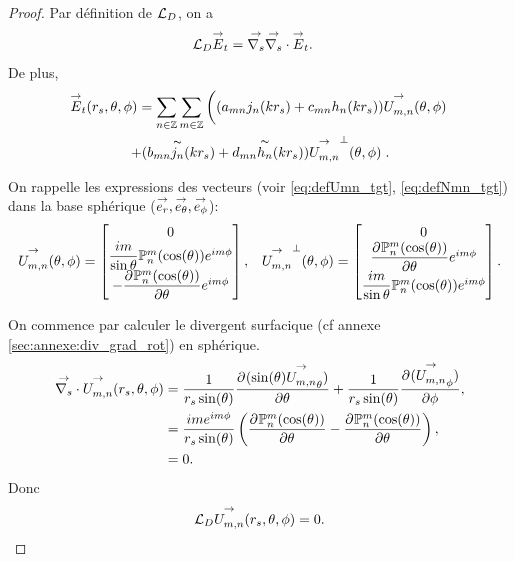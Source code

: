     \begin{proof}
      Par définition de \({\mathcal{L}_D}\), on a
      \begin{align*}
        {\mathcal{L}_D} {\overset{\rightarrow}{E}}_t & = {\overset{\rightarrow}{\nabla_s}}{} {\overset{\rightarrow}{\nabla_s}} \cdot{} {\overset{\rightarrow}{E}}_t.
      \end{align*}
      De plus, 
      \begin{multline*}
        {\overset{\rightarrow}{E}}_t(r_s,\theta,\phi) = \sum_{n\in\mathbb Z}\sum_{m\in\mathbb Z} \left( (a_{mn} j_n(kr_s) + c_{mn}h_n(kr_s)) {\overset{\rightarrow}{U_{m,n}^{{}}}}(\theta,\phi) 
        \right.
        \\
        \left.
        + (b_{mn} \overset{\thicksim}{j_n}(kr_s)+d_{mn} \overset{\thicksim}{h_n}(kr_s)) {\overset{\rightarrow}{U_{m,n}^{{}}}}^\perp(\theta,\phi)\right.
        .
      \end{multline*}

      On rappelle  les expressions des vecteurs (voir \eqref{eq:defUmn_tgt}, \eqref{eq:defNmn_tgt}) dans la base sphérique (\({\overset{\rightarrow}{e_r}},{\overset{\rightarrow}{e_\theta}},{\overset{\rightarrow}{e_\phi}}\)): 
      \begin{align*}
        {\overset{\rightarrow}{U_{m,n}^{{}}}}(\theta,\phi) =
        \begin{bmatrix}
            0
            \\
            \dfrac{im}{\sin\theta}\mathbb{P}^m_n(\cos(\theta))e^{im\phi}
            \\
            - \dfrac{\partial^{{}} \mathbb{P}^m_n(\cos(\theta))}{{\partial \theta}^{{}}}e^{im\phi}
        \end{bmatrix},
        &&
        {\overset{\rightarrow}{U_{m,n}^{{}}}}^\perp(\theta,\phi) =
        \begin{bmatrix}
          0
          \\
          \dfrac{\partial^{{}} \mathbb{P}^m_n(\cos(\theta))}{{\partial \theta}^{{}}}e^{im\phi}
          \\
          \dfrac{im}{\sin\theta}\mathbb{P}^m_n(\cos(\theta))e^{im\phi}
        \end{bmatrix}.
      \end{align*}

      On commence par calculer le divergent surfacique (cf annexe \ref{sec:annexe:div_grad_rot}) en sphérique.
      \begin{align*}
        {\overset{\rightarrow}{\nabla_s}} \cdot{}{\overset{\rightarrow}{U_{m,n}^{{}}}}(r_s,\theta,\phi) &= \dfrac{1}{r_s\sin(\theta)} \dfrac{\partial^{{}} (\sin(\theta){\overset{\rightarrow}{U_{m,n}^{{}}}}_\theta)}{{\partial \theta}^{{}}} + \dfrac{1}{r_s\sin(\theta)}\dfrac{\partial^{{}} ({\overset{\rightarrow}{U_{m,n}^{{}}}}_\phi)}{{\partial \phi}^{{}}},
        \\
        &=\dfrac{ime^{im\phi}}{r_s\sin(\theta)}\left( \dfrac{\partial^{{}} \mathbb{P}^m_n(\cos(\theta))}{{\partial \theta}^{{}}} - \dfrac{\partial^{{}} \mathbb{P}^m_n(\cos(\theta))}{{\partial \theta}^{{}}} \right),
        \\
        &= 0.
      \end{align*}
      Donc 
      \begin{align*}
        {\mathcal{L}_D}{\overset{\rightarrow}{U_{m,n}^{{}}}}(r_s,\theta,\phi) = 0.
      \end{align*}


\end{proof}
